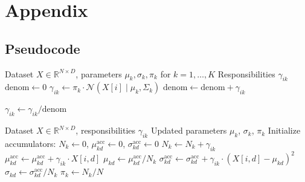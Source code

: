 \appendix
\section{Appendix}

\subsection*{Pseudocode}
\label{app:pseudocode}
\begin{algorithm}[H]
    \caption{E-step: Computation of Responsibilities}
    \begin{algorithmic}[1]
        \Require Dataset $X \in \mathbb{R}^{N \times D}$, parameters $\mu_{k}, \sigma_{k}, \pi_{k}$ for $k=1,\dots,K$
        \Ensure Responsibilities $\gamma_{ik}$
            \State $\text{denom} \gets 0$
                \State $\gamma_{ik}  \gets \pi_k \cdot \mathcal{N}(X[i] \mid \mu_k, \Sigma_k)$ 
                \State $\text{denom} \gets \text{denom} + \gamma_{ik}$
            \EndFor

                \State $\gamma_{ik} \gets \gamma_{ik} / \text{denom}$ 
        \EndFor
        \EndFor
    \end{algorithmic}
    \label{e_step_alg}
\end{algorithm}

\begin{algorithm}[H]
    \caption{M-step: Parameter Update}
    \begin{algorithmic}[1]
        \Require Dataset $X \in \mathbb{R}^{N \times D}$, responsibilities $\gamma_{ik}$
        \Ensure Updated parameters $\mu_k$, $\sigma_k$, $\pi_k$
        \State Initialize accumulators: $N_k \gets 0$, $\mu^{\text{acc}}_{kd} \gets 0$, $\sigma^{\text{acc}}_{kd} \gets 0$
                \State $N_k \gets N_k + \gamma_{ik}$
                    \State $\mu^{\text{acc}}_{kd} \gets \mu^{\text{acc}}_{kd} + \gamma_{ik} \cdot X[i,d]$
                \EndFor
            \EndFor
        \EndFor
                \State $\mu_{kd} \gets \mu^{\text{acc}}_{kd} / N_k$
            \EndFor
        \EndFor
                    \State $\sigma^{\text{acc}}_{kd} \gets \sigma^{\text{acc}}_{kd} + \gamma_{ik} \cdot (X[i,d] - \mu_{kd})^2$
                \EndFor
            \EndFor
        \EndFor
                \State $\sigma_{kd} \gets \sigma^{\text{acc}}_{kd} / N_k$
            \EndFor
            \State $\pi_k \gets N_k / N$
        \EndFor
    \end{algorithmic}
    \label{m_step_alg}
\end{algorithm}

